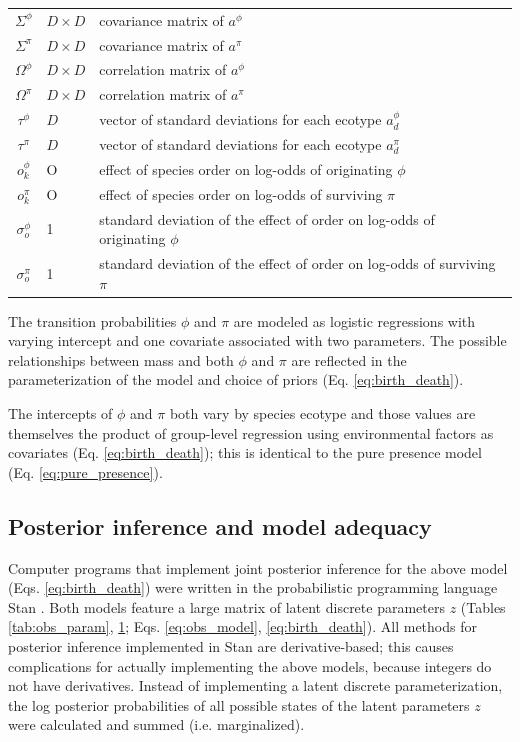 \documentclass[12pt,letterpaper]{article}
\begin{document}
\begin{table}
\begin{tabular}{c l l}
    \(\Sigma^{\phi}\) & \(D \times D\) & covariance matrix of \(a^{\phi}\) \\
    \(\Sigma^{\pi}\) & \(D \times D\) & covariance matrix of \(a^{\pi}\) \\
    \(\Omega^{\phi}\) & \(D \times D\) & correlation matrix of \(a^{\phi}\) \\
    \(\Omega^{\pi}\) & \(D \times D\) & correlation matrix of \(a^{\pi}\) \\
    \(\tau^{\phi}\) & \(D\) & vector of standard deviations for each ecotype \(a^{\phi}_{d}\) \\
    \(\tau^{\pi}\) & \(D\) & vector of standard deviations for each ecotype \(a^{\pi}_{d}\) \\
    \(o^{\phi}_{k}\) & O & effect of species order on log-odds of originating \(\phi\) \\
    \(o^{\pi}_{k}\) & O & effect of species order on log-odds of surviving \(\pi\) \\
    \(\sigma^{\phi}_{o}\) & 1 & standard deviation of the effect of order on log-odds of originating \(\phi\) \\
    \(\sigma^{\pi}_{o}\) & 1 & standard deviation of the effect of order on log-odds of surviving \(\pi\) \\
  \end{tabular}
  \label{tab:bd_param}
\end{table}

The transition probabilities \(\phi\) and \(\pi\) are modeled as logistic regressions with varying intercept and one covariate associated with two parameters. The possible relationships between mass and both \(\phi\) and \(\pi\) are reflected in the parameterization of the model and choice of priors (Eq. \ref{eq:birth_death}).

The intercepts of \(\phi\) and \(\pi\) both vary by species ecotype and those values are themselves the product of group-level regression using environmental factors as covariates (Eq. \ref{eq:birth_death}); this is identical to the pure presence model (Eq. \ref{eq:pure_presence}).


\subsection*{Posterior inference and model adequacy}
Computer programs that implement joint posterior inference for the above model (Eqs. \ref{eq:birth_death}) were written in the probabilistic programming language Stan \citep{StanDevelopmentTeam2016}. Both models feature a large matrix of latent discrete parameters \(z\) (Tables \ref{tab:obs_param}, \ref{tab:bd_param}; Eqs. \ref{eq:obs_model}, \ref{eq:birth_death}). All methods for posterior inference implemented in Stan are derivative-based; this causes complications for actually implementing the above models, because integers do not have derivatives. Instead of implementing a latent discrete parameterization, the log posterior probabilities of all possible states of the latent parameters \(z\) were calculated and summed (i.e. marginalized). 
\end{document}
